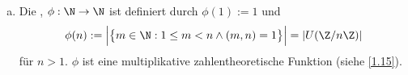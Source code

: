 \begin{nt}
\begin{enumerate}[a)]
			\begin{proof}
				\begin{segnb}{\ProofImplication}
					Es gilt $n,m \divs a - b$.
					Wegen $\kgV(n,m) = \f{nm}{\ggT(n,m)} = nm$ daher auch $nm \divs a - b$, also $a \equiv b \bmod nm$.
				\end{segnb}
				\begin{segnb}{\ProofImplication*}
					Wegen $nm \divs a - b$ ist $n,m \divs nm \divs a - b$, also $a \equiv b \bmod n,m$.
				\end{segnb}
			\end{proof}
		\item
			Die , $\phi: \N \to \N$ ist definiert durch $\phi(1) := 1$ und
			\[
				\phi(n)
				:= \Big| \big\{m \in \N : 1 \le m < n \land (m,n) = 1 \big\} \Big|
				= |U(\Z / n\Z)|
			\]
			für $n > 1$.
			$\phi$ ist eine multiplikative zahlentheoretische Funktion (siehe \ref{1.15}).
	\end{enumerate}
\end{nt}


